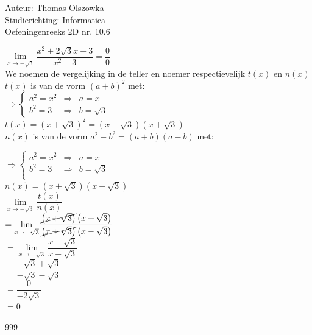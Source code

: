 \documentclass[a4paper]{article}
\newcommand{\llim}{\lim\limits}
\begin{document}
\noindent \large Auteur: Thomas Olszowka \\
\noindent \large Studierichting: Informatica \\
\noindent \large Oefeningenreeks 2D nr. 10.6  \\



\medskip

\normalsize

$\llim_{x \rightarrow -\sqrt{3}} \dfrac{x^2 + 2\sqrt{3}x + 3}{x^2 - 3} = \dfrac{0}{0}$ \\

We noemen de vergelijking in de teller en noemer respectievelijk $t(x)$ en $n(x)$\\

$t(x)$ is van de vorm $(a+b)^2$ met: \\

$\Rightarrow \left\{
\begin{array}{lll}
a^2 = x^2 &\Rightarrow& a = x    \\

b^2 = 3 &\Rightarrow& b = \sqrt{3}
\end{array}
\right .$\\

$t(x) = \left(x+\sqrt{3}\right)^2 =\left(x+\sqrt{3}\right)\left(x+\sqrt{3}\right) $\\

$n(x)$ is van de vorm $a^2 - b^2 = (a+b)(a-b)$ met:

$\Rightarrow \left\{
\begin{array}{lll}
a^2 = x^2 &\Rightarrow& a = x    \\

b^2 = 3 &\Rightarrow& b = \sqrt{3}  \\
\end{array}
\right .$\\

$n(x) = \left(x+\sqrt{3}\right) \left(x-\sqrt{3}\right)$ \\

$\llim_{x \rightarrow -\sqrt{3}} \dfrac{t(x)}{n(x)}$ \\

$= \llim_{x \rightarrow -\sqrt{3}} \dfrac{\cancel{\left(x+\sqrt{3}\right)}\left(x+\sqrt{3}\right)}{\cancel{\left(x+\sqrt{3}\right)}\left(x-\sqrt{3}\right)}$ \\

$=\llim_{x \rightarrow -\sqrt{3}} \dfrac{x+\sqrt{3}}{x-\sqrt{3}}$ \\

$= \dfrac{-\sqrt{3} + \sqrt{3}}{-\sqrt{3} - \sqrt{3}}$ \\

$= \dfrac{0}{-2\sqrt{3}}$ \\

$= 0$ \\


\begin{thebibliography}{999}
\end{thebibliography}
\end{document}
